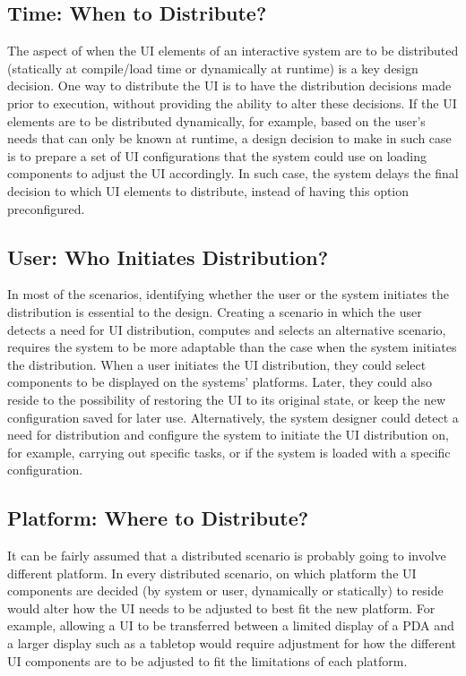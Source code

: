 \subsection{Time: When to Distribute?}
The aspect of when the UI elements of an interactive system are to be distributed (statically at compile/load time or dynamically at runtime) is a key design decision. One way to distribute the UI is to have the distribution decisions made prior to execution, without providing the ability to alter these decisions. If the UI elements are to be distributed dynamically, for example, based on the user's needs that can only be known at runtime, a design decision to make in such case is to prepare a set of UI configurations that the system could use on loading components to adjust the UI accordingly. In such case, the system delays the final decision to which UI elements to distribute, instead of having this option preconfigured.    

\subsection{User: Who Initiates Distribution?}
In most of the scenarios, identifying whether the user or the system initiates the distribution is essential to the design. Creating a scenario in which the user detects a need for UI distribution, computes and selects an alternative scenario, requires the system to be more adaptable than the case when the system initiates the distribution. When a user initiates the UI distribution, they could select components to be displayed on the systems' platforms. Later, they could also reside to the possibility of restoring the UI to its original state, or keep the new configuration saved for later use. Alternatively, the system designer could detect a need for distribution and configure the system to initiate the UI distribution on, for example, carrying out specific tasks, or if the system is loaded with a specific configuration.    
 
\subsection{Platform: Where to Distribute?}
It can be fairly assumed that a distributed scenario is probably going to involve different platform. In every distributed scenario, on which platform the UI components are decided (by system or user, dynamically or statically) to reside would alter how the UI needs to be adjusted to best fit the new platform. For example, allowing a UI to be transferred between a limited display of a PDA and a larger display such as a tabletop would require adjustment for how the different UI components are to be adjusted to fit the limitations of each platform.   

